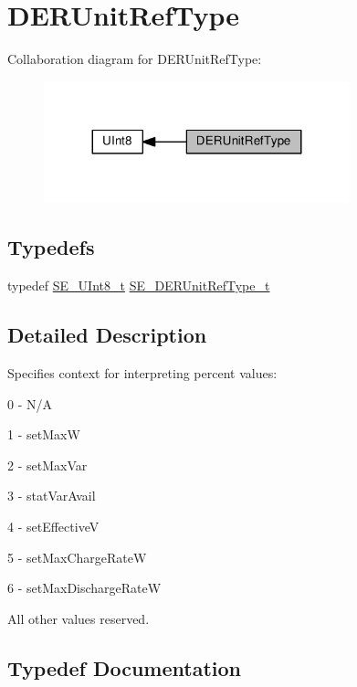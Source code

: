 \hypertarget{group__DERUnitRefType}{}\section{D\+E\+R\+Unit\+Ref\+Type}
\label{group__DERUnitRefType}
Collaboration diagram for D\+E\+R\+Unit\+Ref\+Type\+:\nopagebreak
\begin{figure}[H]
\begin{center}
\leavevmode
\includegraphics[width=251pt]{group__DERUnitRefType}
\end{center}
\end{figure}
\subsection*{Typedefs}
\begin{DoxyCompactItemize}
\item 
typedef \hyperlink{group__UInt8_gaf7c365a1acfe204e3a67c16ed44572f5}{S\+E\+\_\+\+U\+Int8\+\_\+t} \hyperlink{group__DERUnitRefType_gaff0b9dcda4cd888095dba6d262e5ce86}{S\+E\+\_\+\+D\+E\+R\+Unit\+Ref\+Type\+\_\+t}
\end{DoxyCompactItemize}


\subsection{Detailed Description}
Specifies context for interpreting percent values\+:

0 -\/ N/A

1 -\/ set\+MaxW

2 -\/ set\+Max\+Var

3 -\/ stat\+Var\+Avail

4 -\/ set\+EffectiveV

5 -\/ set\+Max\+Charge\+RateW

6 -\/ set\+Max\+Discharge\+RateW

All other values reserved. 

\subsection{Typedef Documentation}
\mbox{\label{group__DERUnitRefType_gaff0b9dcda4cd888095dba6d262e5ce86}} 
